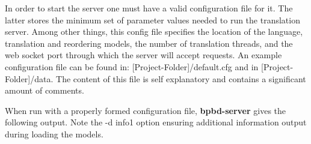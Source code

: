 In order to start the server one must have a valid configuration file for it. The latter stores the minimum set of parameter values needed to run the translation server. Among other things, this config file specifies the location of the language, translation and reordering models, the number of translation threads, and the web socket port through which the server will accept requests. An example configuration file can be found in\+: {\ttfamily \mbox{[}Project-\/\+Folder\mbox{]}/default.cfg} and in {\ttfamily \mbox{[}Project-\/\+Folder\mbox{]}/data}. The content of this file is self explanatory and contains a significant amount of comments.

When run with a properly formed configuration file, {\bfseries bpbd-\/server} gives the following output. Note the {\ttfamily -\/d info1} option ensuring additional information output during loading the models.



